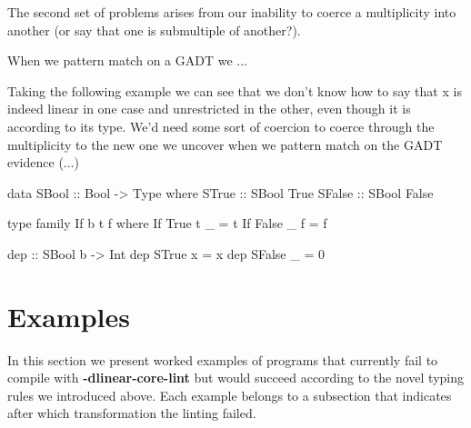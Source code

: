 \documentclass[a4paper, draft]{article}
\begin{document}
The second set of problems arises from our inability to coerce a multiplicity
into another (or say that one is submultiple of another?).

When we pattern match on a GADT we ...

Taking the following example we can see that we don't know how to say
that x is indeed linear in one case and unrestricted in the other, even though
it is according to its type. We'd need some sort of coercion to coerce through
the multiplicity to the new one we uncover when we pattern match on the GADT
evidence (...)

\begin{code}
data SBool :: Bool -> Type where
  STrue :: SBool True
  SFalse :: SBool False

type family If b t f where
  If True t _ = t
  If False _ f = f

dep :: SBool b -> Int %
dep STrue x = x
dep SFalse _ = 0
\end{code}








\section{Examples\label{examples}}

In this section we present worked examples of programs that currently fail to
compile with \textbf{-dlinear-core-lint} but would succeed according to the
novel typing rules we introduced above. Each example belongs to a subsection
that indicates after which transformation the linting failed.
\end{document}

